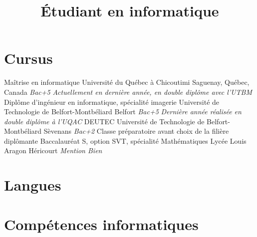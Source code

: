 \documentclass[10pt,sans]{moderncv}
\title{Étudiant en informatique}
\begin{document}
	\maketitle


	\section{Cursus}
			{Maîtrise en informatique}
			{Université du Québec à Chicoutimi}
			{Saguenay, Québec, Canada}
			{\textit{Bac+5}}
			{\textit{Actuellement en dernière année, en double diplôme avec l'UTBM}}
			{Diplôme d'ingénieur en informatique, spécialité imagerie}
			{Université de Technologie de Belfort-Montbéliard}
			{Belfort}
			{\textit{Bac+5}}
			{\textit{Dernière année réalisée en double diplôme à l'UQAC}}
			{DEUTEC}
			{Université de Technologie de Belfort-Montbéliard}
			{Sèvenans}
			{\textit{Bac+2}}
			{Classe préparatoire avant choix de la filière diplômante}
			{Baccalauréat S, option SVT, spécialité Mathématiques}
			{Lycée Louis Aragon}
			{Héricourt}
			{\textit{Mention Bien}}
			{}


	\vspace*{\deletedSpace}
	\section{Langues}


	\vspace*{\deletedSpace}
	\section{Compétences informatiques}
\end{document}
